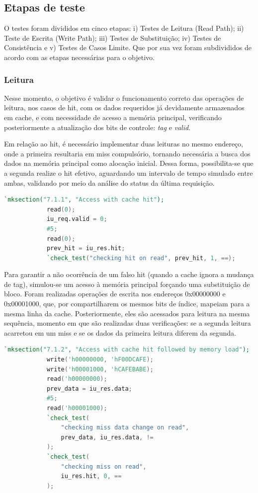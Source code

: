 \documentclass[12pt]{article}
\begin{document}
\subsection{Etapas de teste}

O testes foram divididos em cinco etapas: i) Testes de Leitura (Read Path); 
ii) Teste de Escrita (Write Path); iii) Testes de Substituição; iv) Testes de Consistência 
e v) Testes de Casos Limite. Que por sua vez foram subdivididos de acordo com as
etapas necessárias para o objetivo.

\subsubsection{Leitura}

Nesse momento, o objetivo é validar o funcionamento correto das operações de leitura, nos casos de hit, com os dados requeridos já devidamente armazenados em cache, e com necessidade de acesso a memória principal, verificando posteriormente a atualização dos bits de controle: \emph{tag} e \emph{valid}.

Em relação ao hit, é necessário implementar duas leituras no mesmo endereço, onde a primeira resultaria em miss compulsório, tornando necessária a busca dos dados na memória principal como alocação inicial. Dessa forma, possibilita-se que a segunda realize o hit efetivo, aguardando um intervalo de tempo simulado entre ambas, validando por meio da análise do status da última requisição.

\begin{lstlisting}[language=Verilog]
            `mksection("7.1.1", "Access with cache hit");
            read(0);
            iu_req.valid = 0;
            #5;
            read(0);
            prev_hit = iu_res.hit;
            `check_test("checking hit on read", prev_hit, 1, ==);
\end{lstlisting}

Para garantir a não ocorrência de um falso hit (quando a cache ignora a mudança de tag), simulou-se um acesso à memória principal forçando uma substituição de bloco. Foram realizadas operações de escrita nos endereços 0x00000000 e 0x00001000, que, por compartilharem os mesmos bits de índice, mapeiam para a mesma linha da cache. Posteriormente, eles são acessados para leitura na mesma sequência, momento em que são realizadas duas verificações: se a segunda leitura acarretou em um miss e se os dados da primeira leitura diferem da segunda.

\begin{lstlisting}[language=Verilog]
            `mksection("7.1.2", "Access with cache hit followed by memory load");
            write('h00000000, 'hF00DCAFE);
            write('h00001000, 'hCAFEBABE);
            read('h00000000);
            prev_data = iu_res.data; 
            #5;
            read('h00001000);
            `check_test(
                "checking miss data change on read", 
                prev_data, iu_res.data, !=
            );
            `check_test(
                "checking miss on read", 
                iu_res.hit, 0, ==
            );
\end{lstlisting}
\end{document}

